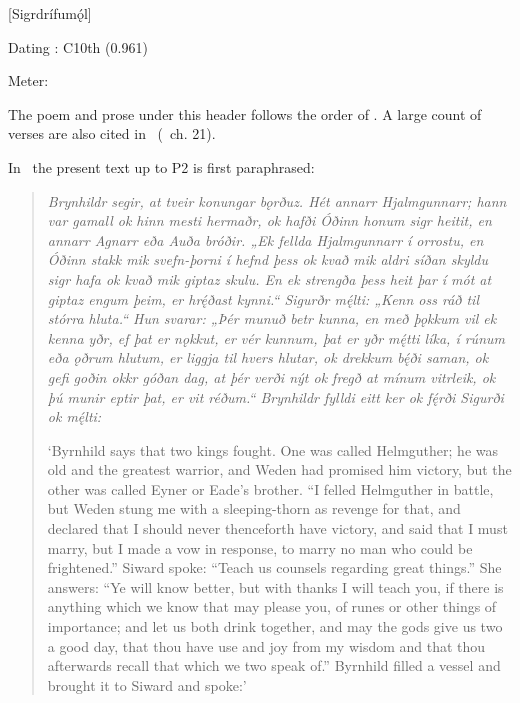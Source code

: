 [Sigrdrífumǫ́l]

\begin{flushright}%
Dating \parencite{Sapp2022}: C10th (0.961)

Meter: \Ljodahattr%
\end{flushright}


The poem and prose under this header follows the order of \Regius. A large count of verses are also cited in \VolsungaMS\ (\VolsungaSaga\ ch. 21).

In \VolsungaSaga\ the present text up to P2 is first paraphrased:

\begin{quote}
  \emph{Brynhildr segir, at tveir konungar bǫrðuz. Hét annarr Hjalmgunnarr; hann var gamall ok hinn mesti hermaðr, ok hafði Óðinn honum sigr heitit, en annarr Agnarr eða Auða bróðir. „Ek fellda Hjalmgunnarr í orrostu, en Óðinn stakk mik svefn-þorni í hefnd þess ok kvað mik aldri síðan skyldu sigr hafa ok kvað mik giptaz skulu. En ek strengða þess heit þar í mót at giptaz engum þeim, er hrę́ðast kynni.“ Sigurðr mę́lti: „Kenn oss ráð til stórra hluta.“ Hun svarar: „Þér munuð betr kunna, en með þǫkkum vil ek kenna yðr, ef þat er nǫkkut, er vér kunnum, þat er yðr mę́tti líka, í rúnum eða ǫðrum hlutum, er liggja til hvers hlutar, ok drekkum bę́ði saman, ok gefi goðin okkr góðan dag, at þér verði nýt ok fregð at mínum vitrleik, ok þú munir eptir þat, er vit réðum.“ Brynhildr fylldi eitt ker ok fę́rði Sigurði ok mę́lti:}

  ‘Byrnhild says that two kings fought. One was called Helmguther; he was old and the greatest warrior, and Weden had promised him victory,
  but the other was called Eyner or Eade’s brother. “I felled Helmguther in battle, but Weden stung me with a sleeping-thorn as revenge for that, and declared that I should never thenceforth have victory, and said that I must marry, but I made a vow in response, to marry no man who could be frightened.” Siward spoke: “Teach us counsels regarding great things.” She answers: “Ye will know better, but with thanks I will teach you, if there is anything which we know that may please you, of runes or other things of importance; and let us both drink together, and may the gods give us two a good day, that thou have use and joy from my wisdom and that thou afterwards recall that which we two speak of.” Byrnhild filled a vessel and brought it to Siward and spoke:’
\end{quote}

